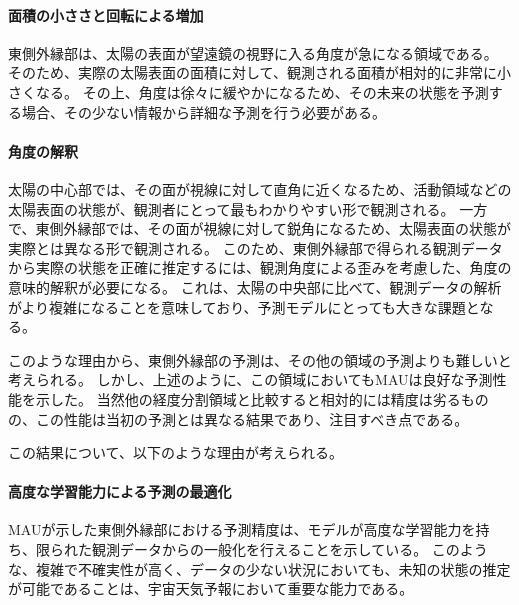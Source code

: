       \paragraph{面積の小ささと回転による増加}
        東側外縁部は、太陽の表面が望遠鏡の視野に入る角度が急になる領域である。
        そのため、実際の太陽表面の面積に対して、観測される面積が相対的に非常に小さくなる。
        その上、角度は徐々に緩やかになるため、その未来の状態を予測する場合、その少ない情報から詳細な予測を行う必要がある。
      \paragraph{角度の解釈}
        太陽の中心部では、その面が視線に対して直角に近くなるため、活動領域などの太陽表面の状態が、観測者にとって最もわかりやすい形で観測される。
        一方で、東側外縁部では、その面が視線に対して鋭角になるため、太陽表面の状態が実際とは異なる形で観測される。
        このため、東側外縁部で得られる観測データから実際の状態を正確に推定するには、観測角度による歪みを考慮した、角度の意味的解釈が必要になる。
        これは、太陽の中央部に比べて、観測データの解析がより複雑になることを意味しており、予測モデルにとっても大きな課題となる。
      
      このような理由から、東側外縁部の予測は、その他の領域の予測よりも難しいと考えられる。
      しかし、上述のように、この領域においてもMAUは良好な予測性能を示した。
      当然他の経度分割領域と比較すると相対的には精度は劣るものの、この性能は当初の予測とは異なる結果であり、注目すべき点である。
      
      この結果について、以下のような理由が考えられる。
      \paragraph{高度な学習能力による予測の最適化}
        MAUが示した東側外縁部における予測精度は、モデルが高度な学習能力を持ち、限られた観測データからの一般化を行えることを示している。
        このような、複雑で不確実性が高く、データの少ない状況においても、未知の状態の推定が可能であることは、宇宙天気予報において重要な能力である。

